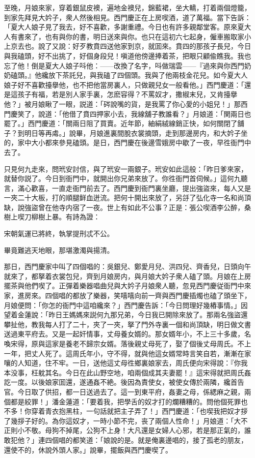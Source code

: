 至晚，月娘來家，穿着銀鼠皮襖，遍地金襖兒，錦藍裙，坐大轎，打着兩個燈籠，到家先拜見大妗子，衆人然後相見。西門慶正在上房喫酒，道了萬福。當下告訴：「夏大人娘子見了我去，好不喜歡，多謝重禮。今日也有許多親鄰堂客。原來夏大人有書來了，也有與你的書，明日送來與你。也只在這初六七起身，僱車搬取家小上京去也。說了又說：好歹教賁四送他家到京，就囬來。賁四的那孩子長兒，今日與我磕頭，好不出挑了，好個身段兒！嗔道他傍邊捧着茶，把眼只顧偸瞧我。我也忘了他！倒是夏大人娘子呌他：——改換了名字，呌做瑞雲——『過來與你西門奶奶磕頭。』他纔放下茶託兒，與我磕了四個頭。我與了他兩枝金花兒。如今夏大人娘子好不喜歡擡擧他，也不把他當房裏人，只做親兒女一般看他。」西門慶道：「還是這孩子有福，若是別人家手裏，怎麽容得？不罵奴才，撒椒末兒，又肯擡擧他？」被月娘瞅了一眼，説道：「硶說嘴的貨，是我罵了你心愛的小姐兒！」那西門慶笑了，說道：「他借了賁四押家小去，我線舖子教誰看？」月娘道：「関兩日也罷了。」西門慶道：「關兩日阻了買賣。近年節，紬絹絨線銷正快，如何關閉了舖子？到明日等再䖏。」說畢，月娘進裏間脫衣裳摘頭，走到那邊房内，和大妗子坐的，家中大小都來參見磕頭。是日，西門慶在後邊雪娥房中歇了一夜，早徃衙門中去了。

只見何九走來，問玳安討信，與了玳安一兩銀子。玳安如此這般：「昨日爹來家，就替你説了。今日到衙門中，就開出你兄弟來放了。你徃衙門首伺候。」這何九聽言，滿心歡喜，一直走衙門前去了。西門慶到衙門裏坐廳，提出強盜來，每人又是一夾二十大板，打的順腿鲜血迸流。把何十開出來放了，另㧱了弘化寺一名和尚頂缺，說強盜曾在他寺内宿了一夜。世上有如此不公事？正是：張公喫酒李公醉，桑樹上喫刀柳樹上暴。有詩為證：

\begin{myquote}
宋朝氣運已將終，執掌提刑忒不公。

畢竟難逃天地眼，那堪激濁與揚清。
\end{myquote}

那日，西門慶家中叫了四個唱的：吳銀兒、鄭愛月兒、洪四兒、齊香兒，日頭向午就來了，都拏着衣裳包兒，齊到月娘房内，與月娘大妗子衆人磕了頭。月娘在上房擺茶與他們喫了。正彈着樂器唱曲兒與大妗子月娘衆人聽，忽見西門慶従衙門中來家，進房來。四個唱的都放了樂器，笑嘻嘻向前一齊與西門慶插燭也磕了頭坐下，月娘便問：「你怎的衙門中這咱纔來？」西門慶告訴：「今日問理好幾樁事情。」因望着金蓮說：「昨日王媽媽來説何九那兄弟，今日我已開除來放了。那兩名強盜還攀扯他，教我每人打了二十，夾了一夾，拏了門外寺裏一個和尚頂缺，明日做文書送過東平府去。又是一起奸情事，丈母養女婿的。那女婿年小，不上三十多歲，名喚宋得，原與這家是養老不歸宗女婿。落後親丈母死了，娶了個後丈母周氏。不上一年，把丈人死了。這周氏年小，守不得，就與他這女婿常時言笑自若，漸漸在家嚷的人知道，住不牢。一日，送他這丈母徃鄉裏娘家去，周氏便向宋得說：『你我本没事，枉躭其名。今日在此山野空地，咱兩個成其夫妻罷！』這宋得就把周氏姦訖一度。以後娘家囬還，遂通姦不絶。後因為責使女，被使女傳於兩隣，纔首告官。今日取了供招，都一日送過去了。這一到東平府，姦妻之母，係緦麻之親，兩個都是絞罪！」潘金蓮道：「要着我，把學舌的奴才打的爛糟糟的。問他個死罪也不多！你穿着青衣抱黑柱，一句話就把主子弄了！」西門慶道：「也喫我把奴才拶了幾拶子好的。為你這奴才，一時小節不完，丧了兩個人性命！」月娘道：「大不正則小不敬。母狗不掉尾，公狗不上身！大凡還是女婦人心邪，若是那正氣的，誰敢犯他？」連四個唱的都笑道：「娘說的是。就是俺裏邊唱的，接了孤老的朋友，還使不的，休說外頭人家。」說畢，擺飯與西門慶喫了。

